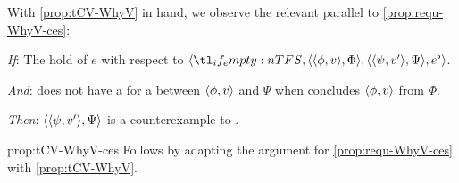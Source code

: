 \begin{note}
  \noindent%
  With \autoref{prop:tCV-WhyV} in hand, we observe the relevant parallel to \autoref{prop:requ-WhyV-ces}:

  \begin{proposition}
    \label{prop:tCV-WhyV-ces}

    \begin{itenum}
    \item[\emph{If}:]
      The  hold of \(e\) with respect to \(\langle \vAgent{}, \pvp{\phi}{v}{\Phi}, \pvp{\psi}{v'}{\Psi}, e^{\flat} \rangle\).
    \item[\emph{And}:]
      \vAgent{} does not have a \wit{} for a \ros{} between \(\langle \phi, v \rangle\) and \(\Psi\) when \vAgent{} concludes \(\langle \phi, v \rangle\) from \(\Phi\).
    \item[\emph{Then}:]
      \(\langle \langle \psi, v' \rangle, \Psi \rangle\) is a counterexample to \issueConstraint{}.
    \end{itenum}
    \vspace{-\baselineskip}
  \end{proposition}

  \begin{argument}{prop:tCV-WhyV-ces}
    Follows by adapting the argument for \autoref{prop:requ-WhyV-ces} with \autoref{prop:tCV-WhyV}.
  \end{argument}
\end{note}







